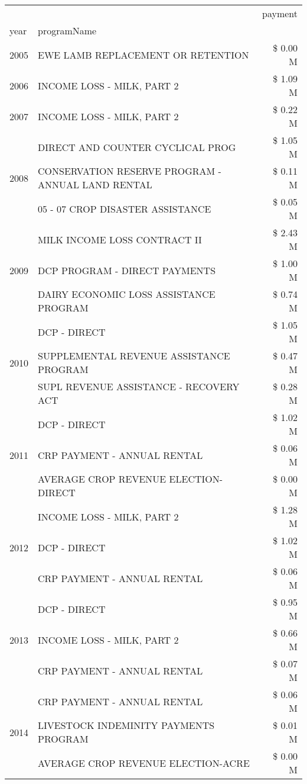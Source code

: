 \begin{tabular}{llr}
\toprule
 &  & payment \\
year & programName &  \\
\midrule
2005 & EWE LAMB REPLACEMENT OR RETENTION & \$ 0.00 M \\
\cline{1-3}
2006 & INCOME LOSS - MILK, PART 2 & \$ 1.09 M \\
\cline{1-3}
2007 & INCOME LOSS - MILK, PART 2 & \$ 0.22 M \\
\cline{1-3}
\multirow[t]{3}{*}{2008} & DIRECT AND COUNTER CYCLICAL PROG & \$ 1.05 M \\
 & CONSERVATION RESERVE PROGRAM - ANNUAL LAND RENTAL & \$ 0.11 M \\
 & 05 - 07 CROP DISASTER ASSISTANCE & \$ 0.05 M \\
\cline{1-3}
\multirow[t]{3}{*}{2009} & MILK INCOME LOSS CONTRACT II & \$ 2.43 M \\
 & DCP PROGRAM - DIRECT PAYMENTS & \$ 1.00 M \\
 & DAIRY ECONOMIC LOSS ASSISTANCE PROGRAM & \$ 0.74 M \\
\cline{1-3}
\multirow[t]{3}{*}{2010} & DCP - DIRECT & \$ 1.05 M \\
 & SUPPLEMENTAL REVENUE ASSISTANCE PROGRAM & \$ 0.47 M \\
 & SUPL REVENUE ASSISTANCE - RECOVERY ACT & \$ 0.28 M \\
\cline{1-3}
\multirow[t]{3}{*}{2011} & DCP - DIRECT & \$ 1.02 M \\
 & CRP PAYMENT - ANNUAL RENTAL & \$ 0.06 M \\
 & AVERAGE CROP REVENUE ELECTION-DIRECT & \$ 0.00 M \\
\cline{1-3}
\multirow[t]{3}{*}{2012} & INCOME LOSS - MILK, PART 2 & \$ 1.28 M \\
 & DCP - DIRECT & \$ 1.02 M \\
 & CRP PAYMENT - ANNUAL RENTAL & \$ 0.06 M \\
\cline{1-3}
\multirow[t]{3}{*}{2013} & DCP - DIRECT & \$ 0.95 M \\
 & INCOME LOSS - MILK, PART 2 & \$ 0.66 M \\
 & CRP PAYMENT - ANNUAL RENTAL & \$ 0.07 M \\
\cline{1-3}
\multirow[t]{3}{*}{2014} & CRP PAYMENT - ANNUAL RENTAL & \$ 0.06 M \\
 & LIVESTOCK INDEMINITY PAYMENTS PROGRAM & \$ 0.01 M \\
 & AVERAGE CROP REVENUE ELECTION-ACRE & \$ 0.00 M \\
\cline{1-3}

\end{tabular}

